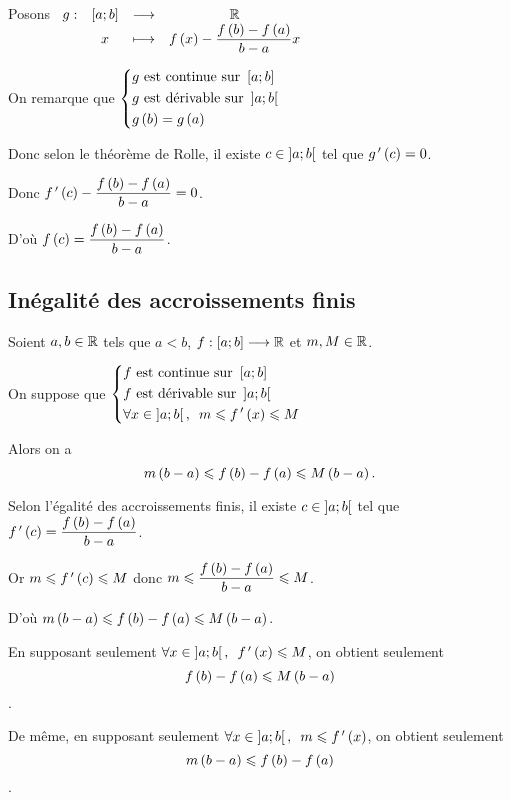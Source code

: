 \begin{dem}
Posons \(\begin{array}[t]{cccc}g : & \left[a;b\right] & \longrightarrow & \mathbb{R} \\ & x & \longmapsto & f\left(x\right)-\dfrac{f\left(b\right)-f\left(a\right)}{b-a}x\end{array}\)

On remarque que \(\begin{dcases}g\text{ est continue sur }\left[a;b\right] \\ g\text{ est dérivable sur }\left]a;b\right[ \\ g\left(b\right)=g\left(a\right)\end{dcases}\)

Donc selon le théorème de Rolle, il existe \(c\in\left]a;b\right[\) tel que \(g^{\,\prime}\left(c\right)=0\).

Donc \(f^{\,\prime}\left(c\right)-\dfrac{f\left(b\right)-f\left(a\right)}{b-a}=0\).

D'où \(f\left(c\right)=\dfrac{f\left(b\right)-f\left(a\right)}{b-a}\).
\end{dem}

\subsection{Inégalité des accroissements finis}

\begin{theo}
Soient \(a,b\in\mathbb{R}\) tels que \(a<b\), \(f:\left[a;b\right]\longrightarrow\mathbb{R}\) et \(m,M\in\mathbb{R}\).

On suppose que \(\begin{dcases}f\text{ est continue sur }\intervii{a}{b} \\ f\text{ est dérivable sur }\intervee{a}{b} \\ \quantifs{\forall x\in\intervee{a}{b}}m\leq f\prim\paren{x}\leq M\end{dcases}\)

Alors on a \[m\left(b-a\right)\leqslant f\left(b\right)-f\left(a\right)\leqslant M\left(b-a\right).\]
\end{theo}

\begin{dem}
Selon l'égalité des accroissements finis, il existe \(c\in\left]a;b\right[\) tel que \(f^{\,\prime}\left(c\right)=\dfrac{f\left(b\right)-f\left(a\right)}{b-a}\).

Or \(m\leqslant f^{\,\prime}\left(c\right)\leqslant M\) donc \(m\leqslant\dfrac{f\left(b\right)-f\left(a\right)}{b-a}\leqslant M\).

D'où \(m\left(b-a\right)\leqslant f\left(b\right)-f\left(a\right)\leqslant M\left(b-a\right)\).
\end{dem}

\begin{rem}
En supposant seulement \(\quantifs{\forall x\in\intervee{a}{b}}f\prim\paren{x}\leq M\), on obtient seulement \[f\left(b\right)-f\left(a\right)\leqslant M\left(b-a\right)\].

De même, en supposant seulement \(\quantifs{\forall x\in\intervee{a}{b}}m\leq f\prim\paren{x}\), on obtient seulement \[m\left(b-a\right)\leqslant f\left(b\right)-f\left(a\right)\].
\end{rem}

